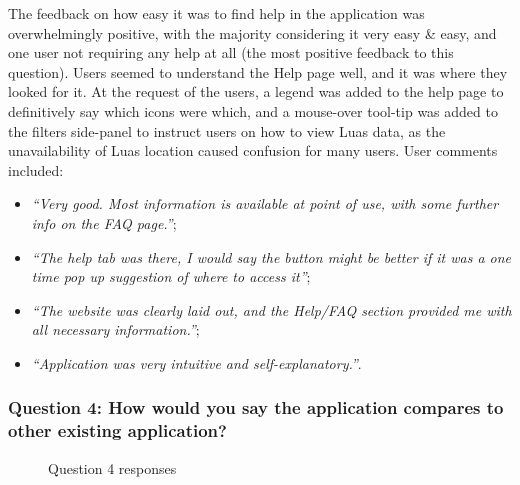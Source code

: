\documentclass[a4paper,11pt]{report}
\begin{document}
The feedback on how easy it was to find help in the application was overwhelmingly positive, with the majority considering it very easy \& easy, and one user not requiring any help at all (the most positive feedback to this question).
Users seemed to understand the Help page well, and it was where they looked for it.
At the request of the users, a legend was added to the help page to definitively say which icons were which, and a mouse-over tool-tip was added to the filters side-panel to instruct users on how to view Luas data, as the unavailability of Luas location caused confusion for many users.
User comments included:
\begin{itemize}
    \item   \textit{``Very good. Most information is available at point of use, with some further info on the FAQ page.''};
    \item   \textit{``The help tab was there, I would say the button might be better if it was a one time pop up suggestion of where to access it''};
    \item   \textit{``The website was clearly laid out, and the Help/FAQ section provided me with all necessary information.''};
    \item   \textit{``Application was very intuitive and self-explanatory.''}.
\end{itemize}

\subsubsection{Question 4: How would you say the application compares to other existing application?}
\begin{figure}[H]
    \centering
    \caption{Question 4 responses}
\end{figure}
\end{document}
